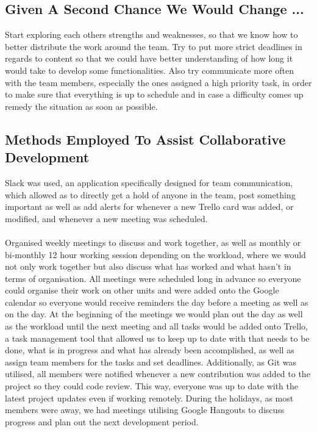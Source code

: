 \documentclass[11pt,a4paper]{article}
\begin{document}
        \subsection{Given A Second Chance We Would Change ...}
        Start exploring each others strengths and weaknesses, so that we know how to better distribute the work around the team. Try to put more strict deadlines in regards to content so that we could have better understanding of how long it would take to develop some functionalities. 
        Also try communicate more often with the team members, especially the ones assigned a high priority task, in order to make sure that everything is up to schedule and in case a difficulty comes up remedy the situation as soon as possible.

        \subsection{Methods Employed To Assist Collaborative Development}
        Slack was used, an application specifically designed for team communication, which allowed as to directly get a hold of anyone in the team, post something important as well as add alerts for whenever a new Trello card was added, or modified, and whenever a new meeting was scheduled. \\ \\
        Organised weekly meetings to discuss and work together, as well as monthly or bi-monthly 12 hour working session depending on the workload, where we would not only work together but also discuss what has worked and what hasn’t in terms of organisation. All meetings were scheduled long in advance so everyone could organise their work on other units and were added onto the Google calendar so everyone would receive reminders the day before a meeting as well as on the day.
        At the beginning of the meetings we would plan out the day as well as the workload until the next meeting and all tasks would be added onto Trello, a task management tool that allowed us to keep up to date with that needs to be done, what is in progress and what has already been accomplished, as well as assign team members for the tasks and set deadlines.
        Additionally, as Git was utilised, all members were notified whenever a new contribution was added to the project so they could code review. This way, everyone was up to date with the latest project updates even if working remotely. 
        During the holidays, as most members were away, we had meetings utilising Google Hangouts to discuss progress and plan out the next development period. 
\end{document}
